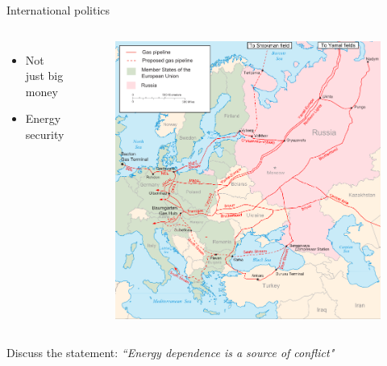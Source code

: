 \documentclass{beamer}
\begin{document}
\begin{frame}{International politics}
\begin{columns}
\begin{itemize}
    \item Not just big money %
    \item Energy security
\end{itemize}{}
\begin{figure}
    \centering
    \includegraphics[width=\textwidth]{../img/Major_russian_gas_pipelines_to_europe.png}
\end{figure}
\end{columns}
\end{frame}{}

\begin{frame}{Discuss the statement:}
\centering
    \textit{\Large{``Energy dependence is a source of conflict"}}
\end{frame}{}
\end{document}

